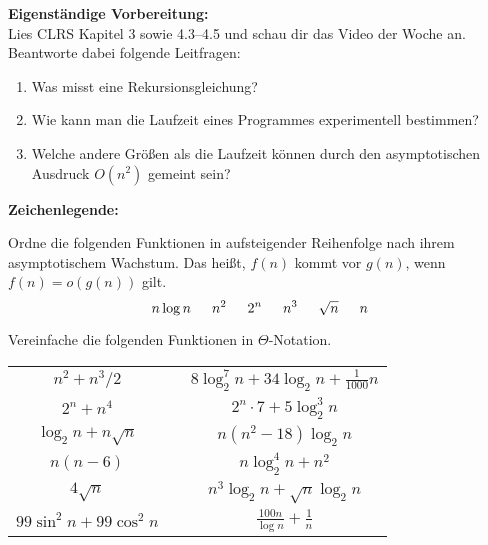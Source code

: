 \documentclass{uebung_cs}
\begin{document}
\textbf{Eigenständige Vorbereitung:}\\
Lies  CLRS Kapitel 3 sowie 4.3--4.5 und schau dir das  Video der Woche an.
Beantworte dabei folgende Leitfragen:
\begin{enumerate}
  \item Was misst eine Rekursionsgleichung?
  \item Wie kann man die Laufzeit eines Programmes experimentell bestimmen?
  \item Welche andere Größen als die Laufzeit können durch den asymptotischen Ausdruck $O(n^2)$ gemeint sein?
\end{enumerate}

\textbf{Zeichenlegende:}
\legende{}



\begin{aufgabe}\label{tue-first}\mbox{}
	Ordne die folgenden Funktionen in aufsteigender Reihenfolge nach ihrem asymptotischem Wachstum.
	Das heißt, $f(n)$ kommt vor $g(n)$, wenn $f(n) = o(g(n))$ gilt.
	\[n \log n\hspace*{15pt} n^2\hspace*{15pt} 2^n\hspace*{15pt} n^3\hspace*{15pt} \sqrt{n}\hspace*{15pt} n\]
\end{aufgabe}

\begin{aufgabe}
	Vereinfache die folgenden Funktionen in $\Theta$-Notation.
	\begin{center}
		\begin{tabular}{ccc}
			$n^2 + n^3/2$
			&&
			$8\log_2^7 n + 34\log_2 n + \frac{1}{1000}n$\\
			$2^n + n^4$&&
			$2^n\cdot 7 + 5\log_2^3 n$\\
			$\log_2n + n\sqrt{n}$&&
			$n(n^2 - 18)\log_2 n$\\
			$n(n-6)$&&
			$n\log_2^4 n + n^2$\\
			$4\sqrt{n}$&&
			$n^3 \log_2 n + \sqrt{n}\log_2 n$\\
			$99\sin^2 n + 99\cos^2 n$&& $\frac{100n}{\log n}+\frac{1}{n}$
		\end{tabular}
	\end{center}
\end{aufgabe}
\end{document}
